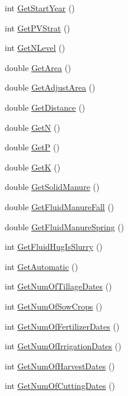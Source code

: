 \begin{DoxyCompactItemize}
\item 
int \hyperlink{classfield_order_ab5e05d0b34a00bbab18b018b0aa9da95}{GetStartYear} ()
\item 
int \hyperlink{classfield_order_a80274584331f359271ca6dfce91d6139}{GetPVStrat} ()
\item 
int \hyperlink{classfield_order_a905b9fcecd896b600792ad24025a10c7}{GetNLevel} ()
\item 
double \hyperlink{classfield_order_a2d9be21e545b46ba9472f947a002c480}{GetArea} ()
\item 
double \hyperlink{classfield_order_a566bf1457e49d94ef8db6d45826adbe6}{GetAdjustArea} ()
\item 
double \hyperlink{classfield_order_acabd0d609184688cd705fb9492066764}{GetDistance} ()
\item 
double \hyperlink{classfield_order_a45e5e632b67ea2d5f70b3b1e342be5f9}{GetN} ()
\item 
double \hyperlink{classfield_order_a65c42d29fa80cc63968c241f87ba4bb6}{GetP} ()
\item 
double \hyperlink{classfield_order_a688fca948b080d4c5af4df5c3934b78f}{GetK} ()
\item 
double \hyperlink{classfield_order_a04ccdb6fde7b00aee7e664dd98cd18c6}{GetSolidManure} ()
\item 
double \hyperlink{classfield_order_af180987c345371da757b523056bac0e2}{GetFluidManureFall} ()
\item 
double \hyperlink{classfield_order_a07400804e760b272a4a5e694c9fda111}{GetFluidManureSpring} ()
\item 
int \hyperlink{classfield_order_a9d9ad79fc1c0b2c77d810ce5abd7e06c}{GetFluidHugIsSlurry} ()
\item 
int \hyperlink{classfield_order_adef295eae96752f77f6c0c4220ae984b}{GetAutomatic} ()
\item 
int \hyperlink{classfield_order_ac131a0aab84fc8cdf09c7ea9a5af4541}{GetNumOfTillageDates} ()
\item 
int \hyperlink{classfield_order_af15a839fd51c41daec59dd90c606c442}{GetNumOfSowCrops} ()
\item 
int \hyperlink{classfield_order_a8c093780ab18203de3c16d38431dbc0b}{GetNumOfFertilizerDates} ()
\item 
int \hyperlink{classfield_order_a62f7f5e8b2099027eac4da08d8f57011}{GetNumOfIrrigationDates} ()
\item 
int \hyperlink{classfield_order_aa946a7785e293445eb0ca7423e347a54}{GetNumOfHarvestDates} ()
\item 
int \hyperlink{classfield_order_a646d0cc7578fb5bd1f8e5d8a815d3eb4}{GetNumOfCuttingDates} ()

\end{DoxyCompactItemize}
